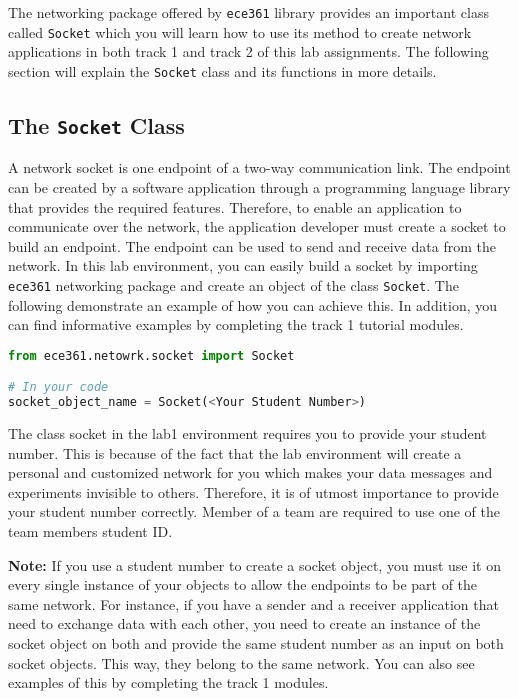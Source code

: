 \documentclass[11pt]{article}
\begin{document}
The networking package offered by \texttt{ece361} library provides an important class called \texttt{Socket} which you will learn how to use its method to create network applications in both track 1 and track 2 of this lab assignments. The following section will explain the \texttt{Socket} class and its functions in more details.

\subsection{The \texttt{Socket} Class}
\label{subsec:socket-class}
A network socket is one endpoint of a two-way communication link. The endpoint can be created by a software application through a programming language library that provides the required features. Therefore, to enable an application to communicate over the network, the application developer must create a socket to build an endpoint. The endpoint can be used to send and receive data from the network. In this lab environment, you can easily build a socket by importing \texttt{ece361} networking package and create an object of the class \texttt{Socket}. The following demonstrate an example of how you can achieve this. In addition, you can find informative examples by completing the track 1 tutorial modules.

\begin{lstlisting}[caption={Importing the \texttt{Socket} class}, language=Python]
from ece361.netowrk.socket import Socket

# In your code
socket_object_name = Socket(<Your Student Number>)
\end{lstlisting}

The class socket in the lab1 environment requires you to provide your student number. This is because of the fact that the lab environment will create a personal and customized network for you which makes your data messages and experiments invisible to others. Therefore, it is of utmost importance to provide your student number correctly. Member of a team are required to use one of the team members student ID.

\textbf{Note:}
If you use a student number to create a socket object, you must use it on every single instance of your objects to allow the endpoints to be part of the same network. For instance, if you have a sender and a receiver application that need to exchange data with each other, you need to create an instance of the socket object on both and provide the same student number as an input on both socket objects. This way, they belong to the same network. You can also see examples of this by completing the track 1 modules.
\end{document}
